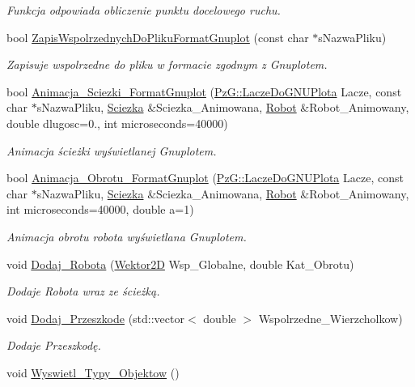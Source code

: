 \begin{DoxyCompactItemize}
\begin{DoxyCompactList}\small\item\em Funkcja odpowiada obliczenie punktu docelowego ruchu. \end{DoxyCompactList}\item 
bool \hyperlink{class_scena_a2a314381bd96a25eb210c2f62348205e}{Zapis\+Wspolrzednych\+Do\+Pliku\+Format\+Gnuplot} (const char $\ast$s\+Nazwa\+Pliku)
\begin{DoxyCompactList}\small\item\em Zapisuje wspolrzedne do pliku w formacie zgodnym z Gnuplotem. \end{DoxyCompactList}\item 
bool \hyperlink{class_scena_a96d2d0967c6be8a6636d0dde76eac2b1}{Animacja\+\_\+\+Sciezki\+\_\+\+Format\+Gnuplot} (\hyperlink{class_pz_g_1_1_lacze_do_g_n_u_plota}{Pz\+G\+::\+Lacze\+Do\+G\+N\+U\+Plota} Lacze, const char $\ast$s\+Nazwa\+Pliku, \hyperlink{class_sciezka}{Sciezka} \&Sciezka\+\_\+\+Animowana, \hyperlink{class_robot}{Robot} \&Robot\+\_\+\+Animowany, double dlugosc=0., int microseconds=40000)
\begin{DoxyCompactList}\small\item\em Animacja ścieżki wyświetlanej Gnuplotem. \end{DoxyCompactList}\item 
bool \hyperlink{class_scena_aabf8e0bf0dbbf0ba0685ff0e6fc87e99}{Animacja\+\_\+\+Obrotu\+\_\+\+Format\+Gnuplot} (\hyperlink{class_pz_g_1_1_lacze_do_g_n_u_plota}{Pz\+G\+::\+Lacze\+Do\+G\+N\+U\+Plota} Lacze, const char $\ast$s\+Nazwa\+Pliku, \hyperlink{class_sciezka}{Sciezka} \&Sciezka\+\_\+\+Animowana, \hyperlink{class_robot}{Robot} \&Robot\+\_\+\+Animowany, int microseconds=40000, double a=1)
\begin{DoxyCompactList}\small\item\em Animacja obrotu robota wyświetlana Gnuplotem. \end{DoxyCompactList}\item 
void \hyperlink{class_scena_aa6593ef7b2fd57236692389692bdd4e6}{Dodaj\+\_\+\+Robota} (\hyperlink{class_wektor2_d}{Wektor2\+D} Wsp\+\_\+\+Globalne, double Kat\+\_\+\+Obrotu)
\begin{DoxyCompactList}\small\item\em Dodaje Robota wraz ze ścieżką. \end{DoxyCompactList}\item 
void \hyperlink{class_scena_a95407075db2d1d2a38839452c7390dbd}{Dodaj\+\_\+\+Przeszkode} (std\+::vector$<$ double $>$ Wspolrzedne\+\_\+\+Wierzcholkow)
\begin{DoxyCompactList}\small\item\em Dodaje Przeszkodę. \end{DoxyCompactList}\item 
\hypertarget{class_scena_a99302d0620b785afe503861f028871bc}{void \hyperlink{class_scena_a99302d0620b785afe503861f028871bc}{Wyswietl\+\_\+\+Typy\+\_\+\+Objektow} ()}\label{class_scena_a99302d0620b785afe503861f028871bc}


\end{DoxyCompactItemize}
